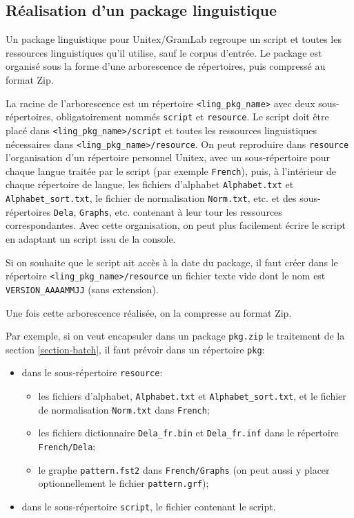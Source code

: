 \subsection{Réalisation d'un package linguistique}
\label{section-packaga-creation}

Un package linguistique pour Unitex/GramLab regroupe un script et toutes les ressources linguistiques
qu'il utilise, sauf le corpus d'entrée. Le package est organisé sous la forme d'une arborescence
de répertoires, puis compressé au format Zip.

\bigskip     {}
\noindent La racine de l'arborescence est un répertoire \verb$<ling_pkg_name>$ avec deux
sous-répertoires, obligatoirement nommés \verb$script$ et \verb$resource$. Le script doit être placé
dans \verb$<ling_pkg_name>/script$ et toutes les ressources linguistiques nécessaires dans
\verb$<ling_pkg_name>/resource$. On peut reproduire dans \verb$resource$ l'organisation d'un
répertoire personnel Unitex, avec un sous-répertoire pour chaque langue traitée par le script
(par exemple \verb$French$), puis, à l'intérieur de chaque répertoire de langue, les fichiers d'alphabet
\verb$Alphabet.txt$ et \verb$Alphabet_sort.txt$, le fichier de normalisation \verb$Norm.txt$, etc. et
des sous-répertoires \verb$Dela$, \verb$Graphs$, etc. contenant à leur tour les ressources
correspondantes. Avec cette organisation, on peut plus facilement écrire le script en adaptant un script
issu de la console.

\bigskip
\noindent Si on souhaite que le script ait accès à la date du package, il faut créer dans le
répertoire \verb$<ling_pkg_name>/resource$ un fichier texte vide dont le nom est
\verb$VERSION_AAAAMMJJ$ (sans extension).

\bigskip
\noindent Une fois cette arborescence réalisée, on la compresse au format Zip.

\bigskip
\noindent Par exemple, si on veut encapsuler dans un package \verb$pkg.zip$ le traitement de la
section \ref{section-batch}, il faut prévoir dans un répertoire \verb$pkg$:
\begin{itemize}
\item dans le sous-répertoire \verb$resource$:
\begin{itemize}
\item les fichiers d'alphabet, \verb$Alphabet.txt$ et \verb$Alphabet_sort.txt$, et le fichier de
normalisation \verb$Norm.txt$ dans \verb$French$;
\item les fichiers dictionnaire \verb$Dela_fr.bin$ et \verb$Dela_fr.inf$ dans le répertoire
\verb$French/Dela$;
\item le graphe \verb$pattern.fst2$ dans \verb$French/Graphs$ (on peut aussi y placer optionnellement
le fichier \verb$pattern.grf$);
\end{itemize}
\item dans le sous-répertoire \verb$script$, le fichier contenant le script.
\end{itemize}




